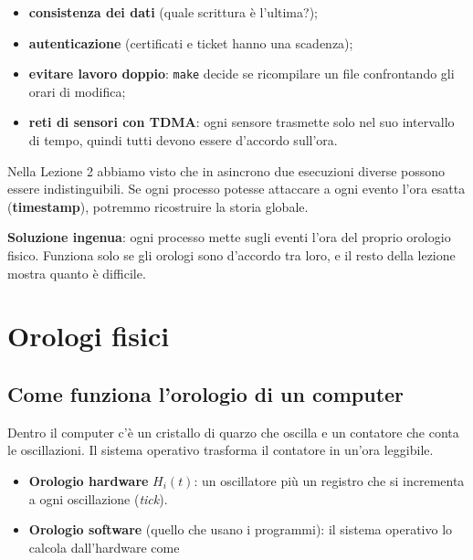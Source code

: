 \begin{itemize}
\tightlist
\item
  \textbf{consistenza dei dati} (quale scrittura è l'ultima?);
\item
  \textbf{autenticazione} (certificati e ticket hanno una scadenza);
\item
  \textbf{evitare lavoro doppio}: \texttt{make} decide se ricompilare un file confrontando gli orari di modifica;
\item
  \textbf{reti di sensori con TDMA}: ogni sensore trasmette solo nel suo intervallo di tempo, quindi tutti devono essere d'accordo sull'ora.
\end{itemize}

Nella Lezione 2 abbiamo visto che in asincrono due esecuzioni diverse possono essere indistinguibili. Se ogni processo potesse attaccare a ogni evento l'ora esatta (\textbf{timestamp}), potremmo ricostruire la storia globale.

\textbf{Soluzione ingenua}: ogni processo mette sugli eventi l'ora del proprio orologio fisico. Funziona solo se gli orologi sono d'accordo tra loro, e il resto della lezione mostra quanto è difficile.

\section{Orologi fisici}

\subsection{Come funziona l'orologio di un computer}

\begin{inbreve}

Dentro il computer c'è un cristallo di quarzo che oscilla e un contatore che conta le oscillazioni. Il sistema operativo trasforma il contatore in un'ora leggibile.

\end{inbreve}

\begin{itemize}
\tightlist
\item
  \textbf{Orologio hardware} \(H_i(t)\): un oscillatore più un registro che si incrementa a ogni oscillazione (\emph{tick}).
\item
  \textbf{Orologio software} (quello che usano i programmi): il sistema operativo lo calcola dall'hardware come
\end{itemize}

